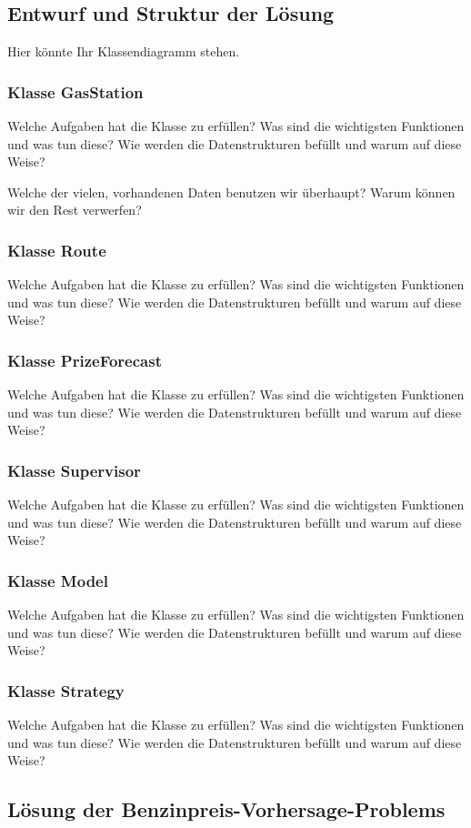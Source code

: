 \documentclass[11pt]{article}
\begin{document}
\subsection{Entwurf und Struktur der Lösung}
	Hier könnte Ihr Klassendiagramm stehen.
\subsubsection{Klasse GasStation}
	Welche Aufgaben hat die Klasse zu erfüllen? Was sind die wichtigsten Funktionen und was tun diese? Wie werden die Datenstrukturen befüllt und warum auf diese Weise?
	
	Welche der vielen, vorhandenen Daten benutzen wir überhaupt? Warum können wir den Rest verwerfen?
\subsubsection{Klasse Route}
	Welche Aufgaben hat die Klasse zu erfüllen? Was sind die wichtigsten Funktionen und was tun diese? Wie werden die Datenstrukturen befüllt und warum auf diese Weise?
\subsubsection{Klasse PrizeForecast}
	Welche Aufgaben hat die Klasse zu erfüllen? Was sind die wichtigsten Funktionen und was tun diese? Wie werden die Datenstrukturen befüllt und warum auf diese Weise?
\subsubsection{Klasse Supervisor}
	Welche Aufgaben hat die Klasse zu erfüllen? Was sind die wichtigsten Funktionen und was tun diese? Wie werden die Datenstrukturen befüllt und warum auf diese Weise?
\subsubsection{Klasse Model}
	Welche Aufgaben hat die Klasse zu erfüllen? Was sind die wichtigsten Funktionen und was tun diese? Wie werden die Datenstrukturen befüllt und warum auf diese Weise?
\subsubsection{Klasse Strategy}
	Welche Aufgaben hat die Klasse zu erfüllen? Was sind die wichtigsten Funktionen und was tun diese? Wie werden die Datenstrukturen befüllt und warum auf diese Weise?
\subsection{Lösung der Benzinpreis-Vorhersage-Problems}
\end{document}
